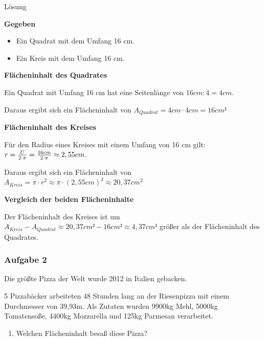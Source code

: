 \documentclass[
  ngerman,
]{book}
\providecommand{\tightlist}{%
  \setlength{\itemsep}{0pt}\setlength{\parskip}{0pt}}
\begin{document}
Lösung

\textbf{Gegeben}

\begin{itemize}
\tightlist
\item
  Ein Quadrat mit dem Umfang 16 cm.
\item
  Ein Kreis mit dem Umfang 16 cm.
\end{itemize}

\textbf{Flächeninhalt des Quadrates}

Ein Quadrat mit Umfang 16 cm hat eine Seitenlänge von \(16cm : 4 = 4cm\).

Daraus ergibt sich ein Flächeninhalt von \(A_{Quadrat} = 4cm \cdot 4cm = 16cm²\)

\textbf{Flächeninhalt des Kreises}

Für den Radius eines Kreises mit einem Umfang von 16 cm gilt: \(r = {U \over 2 \cdot \pi} = {16cm \over 2 \cdot \pi} \approx 2,55cm\).

Daraus ergibt sich ein Flächeninhalt von \(A_{Kreis}= \pi \cdot r^2 \approx \pi \cdot (2,55cm)^2 \approx 20,37 cm^2\)

\textbf{Vergleich der beiden Flächeninhalte}

Der Flächeninhalt des Kreises ist um \(A_{Kreis} - A_{Quadrat} \approx 20,37 cm² - 16 cm ² \approx 4,37 cm²\) größer als der Flächeninhalt des Quadrates.

\hypertarget{section-47}{%
\subsubsection*{}\label{section-47}}

\hypertarget{aufgabe-2-7}{%
\subsubsection*{Aufgabe 2}\label{aufgabe-2-7}}

Die größte Pizza der Welt wurde 2012 in Italien gebacken.

5 Pizzabäcker arbeiteten 48 Stunden lang an der Riesenpizza mit einem Durchmesser von 39,93m. Als Zutaten wurden 9900kg Mehl, 5000kg Tomatensoße, 4400kg Mozzarella und 125kg Parmesan verarbeitet.

\begin{enumerate}
\def\labelenumi{\alph{enumi})}
\tightlist
\item
  Welchen Flächeninhalt besaß diese Pizza?
\end{enumerate}
\end{document}
